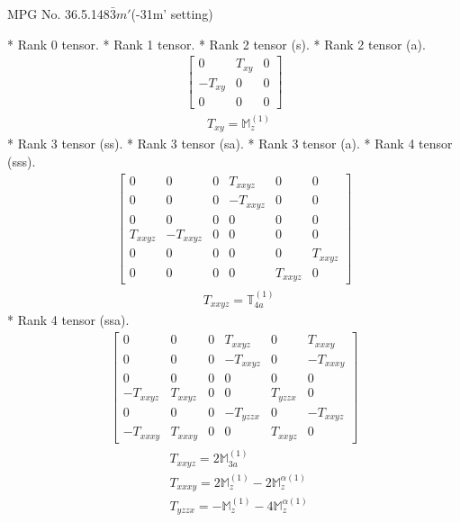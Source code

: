 \documentclass[fleqn,8pt,landscape]{jsarticle}
\begin{document}
\setcounter{MaxMatrixCols}{32}

\renewcommand{\tablename}{Table~}
\renewcommand{\figurename}{Figure~}
\begin{center}
\LARGE
MPG No. 36.5.148\quad$\bar{3}m'$\quad(-31m' setting)
\end{center}
* Rank 0 tensor.
* Rank 1 tensor.
* Rank 2 tensor (s).
* Rank 2 tensor (a).
\begin{align*}
\begin{bmatrix} 0 & T_{xy} & 0 \\ - T_{xy} & 0 & 0 \\ 0 & 0 & 0 \end{bmatrix}
\end{align*}
\begin{align*}
& T_{xy} = \mathbb{M}_{z}^{(1)}
\end{align*}
* Rank 3 tensor (ss).
* Rank 3 tensor (sa).
* Rank 3 tensor (a).
* Rank 4 tensor (sss).
\begin{align*}
\begin{bmatrix} 0 & 0 & 0 & T_{xxyz} & 0 & 0 \\ 0 & 0 & 0 & - T_{xxyz} & 0 & 0 \\ 0 & 0 & 0 & 0 & 0 & 0 \\ T_{xxyz} & - T_{xxyz} & 0 & 0 & 0 & 0 \\ 0 & 0 & 0 & 0 & 0 & T_{xxyz} \\ 0 & 0 & 0 & 0 & T_{xxyz} & 0 \end{bmatrix}
\end{align*}
\begin{align*}
& T_{xxyz} = \mathbb{T}_{4a}^{(1)}
\end{align*}
* Rank 4 tensor (ssa).
\begin{align*}
\begin{bmatrix} 0 & 0 & 0 & T_{xxyz} & 0 & T_{xxxy} \\ 0 & 0 & 0 & - T_{xxyz} & 0 & - T_{xxxy} \\ 0 & 0 & 0 & 0 & 0 & 0 \\ - T_{xxyz} & T_{xxyz} & 0 & 0 & T_{yzzx} & 0 \\ 0 & 0 & 0 & - T_{yzzx} & 0 & - T_{xxyz} \\ - T_{xxxy} & T_{xxxy} & 0 & 0 & T_{xxyz} & 0 \end{bmatrix}
\end{align*}
\begin{align*}
& T_{xxyz} = 2 \mathbb{M}_{3a}^{(1)} \\
& T_{xxxy} = 2 \mathbb{M}_{z}^{(1)} - 2 \mathbb{M}_{z}^{\alpha(1)} \\
& T_{yzzx} = - \mathbb{M}_{z}^{(1)} - 4 \mathbb{M}_{z}^{\alpha(1)}
\end{align*}
\end{document}
